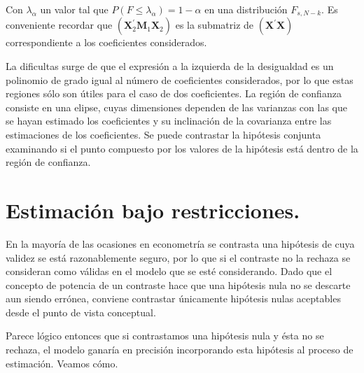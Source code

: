 Con $\lambda_{\alpha}$ un valor tal que $P\left(F\leq\lambda_{\alpha}\right)=1-\alpha$
en una distribuci\'on $F_{s,N-k}$. Es conveniente recordar que $\left(\boldsymbol{X}^{\prime}_{2}\boldsymbol{M}_{1}\boldsymbol{X}_{2}\right)$
es la submatriz de $\left(\boldsymbol{X}^{\prime}\boldsymbol{X}\right)$ correspondiente
a los coeficientes considerados.

La dificultas surge de que el expresi\'on a la izquierda de la desigualdad
es un polinomio de grado igual al n\'umero de coeficientes considerados,
por lo que estas regiones s\'olo son \'utiles para el caso de dos coeficientes.
La regi\'on de confianza consiste en una elipse, cuyas dimensiones dependen
de las varianzas con las que se hayan estimado los coeficientes y
su inclinaci\'on de la covarianza entre las estimaciones de los coeficientes.
Se puede contrastar la hip\'otesis conjunta examinando si el punto compuesto
por los valores de la hip\'otesis est\'a dentro de la regi\'on de confianza.


\section{Estimaci\'on bajo restricciones.}

En la mayor\'ia de las ocasiones en econometr\'ia se contrasta una hip\'otesis
de cuya validez se est\'a razonablemente seguro, por lo que si el contraste
no la rechaza se consideran como v\'alidas en el modelo que se est\'e
considerando. Dado que el concepto de potencia de un contraste hace
que una hip\'otesis nula no se descarte aun siendo err\'onea, conviene
contrastar \'unicamente hip\'otesis nulas aceptables desde el punto de
vista conceptual.

Parece l\'ogico entonces que si contrastamos una hip\'otesis nula y \'esta
no se rechaza, el modelo ganar\'ia en precisi\'on incorporando esta hip\'otesis
al proceso de estimaci\'on. Veamos c\'omo.

